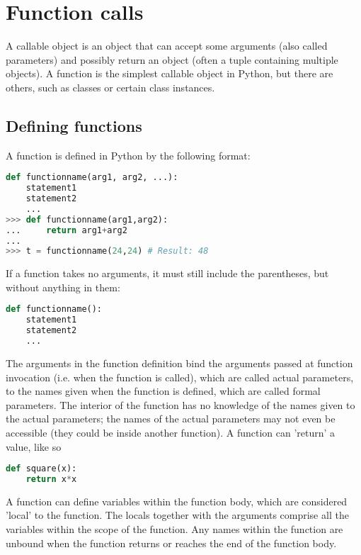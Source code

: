 \section{Function calls}
A callable object is an object that can accept some arguments (also called
parameters) and possibly return an object (often a tuple containing multiple
objects).  A function is the simplest callable object in Python, but there are
others, such as classes or certain class instances.

\subsection{Defining functions}
A function is defined in Python by the following format:
\lstset{basicstyle=\scriptsize, numbers=left, captionpos=b, tabsize=4}
\begin{lstlisting}[caption=Basic Function Usage,language={Python},
xleftmargin=15pt, label=lst:basicfunctionusage]
def functionname(arg1, arg2, ...):
    statement1
    statement2
    ...
>>> def functionname(arg1,arg2):
...     return arg1+arg2
...
>>> t = functionname(24,24) # Result: 48
\end{lstlisting}

If a function takes no arguments, it must still include the parentheses, but
without anything in them:
\lstset{basicstyle=\scriptsize, numbers=left, captionpos=b, tabsize=4}
\begin{lstlisting}[caption=Function Template,language={Python},
xleftmargin=15pt, label=lst:functiontemplate]
def functionname():
    statement1
    statement2
    ...
\end{lstlisting}

The arguments in the function definition bind the arguments passed at function
invocation (i.e. when the function is called), which are called actual
parameters, to the names given when the function is defined, which are called
formal parameters. The interior of the function has no knowledge of the names
given to the actual parameters; the names of the actual parameters may not even
be accessible (they could be inside another function).  A function can 'return'
a value, like so
\lstset{basicstyle=\scriptsize, numbers=left, captionpos=b, tabsize=4}
\begin{lstlisting}[caption=Return values,language={Python},
xleftmargin=15pt, label=lst:returnvalues]
def square(x):
    return x*x
\end{lstlisting}

A function can define variables within the function body, which are considered
'local' to the function. The locals together with the arguments comprise all the
variables within the scope of the function. Any names within the function are
unbound when the function returns or reaches the end of the function body.

